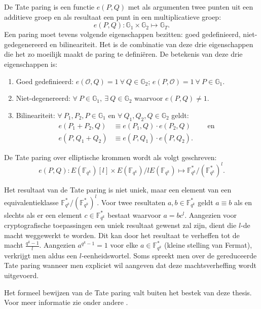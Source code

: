 De Tate paring is een functie $e(P, Q)$ met als argumenten twee punten uit een additieve groep en als resultaat een punt in een multiplicatieve groep:
\[e(P, Q): \mathbb{G}_1 \times \mathbb{G}_2 \mapsto \mathbb{G}_T.\]
Een paring moet tevens volgende eigenschappen bezitten: goed gedefinieerd, niet-gedegenereerd en bilineariteit. Het is de combinatie van deze drie eigenschappen die het zo moeilijk maakt de paring te defini\"eren. De betekenis van deze drie eigenschappen is:
\begin{enumerate}
	\item Goed gedefinieerd: $e(\mathcal{O}, Q) = 1 \: \forall \: Q \in \mathbb{G}_2$; $e(P, \mathcal{O}) = 1 \: \forall \: P \in \mathbb{G}_1$.
	
	\item Niet-degenereerd: $\forall \: P \in \mathbb{G}_1, \: \exists \: Q \in \mathbb{G}_2$ waarvoor $e(P, Q) \neq 1$.
	
	\item Bilineariteit: $\forall \: P_1, P_2, P \in \mathbb{G}_1$ en $\forall \: Q_1, Q_2, Q \in \mathbb{G}_2$ geldt:
		\[\begin{aligned}
			e(P_1 + P_2, Q) &\equiv e(P_1, Q) \cdot e(P_2, Q) \qquad \text{ en }\\
			e(P, Q_1 + Q_2) &\equiv e(P, Q_1) \cdot e(P, Q_2).
		\end{aligned}\]
\end{enumerate}

De Tate paring over elliptische krommen wordt als volgt geschreven:
\[e(P, Q): E(\mathbb{F}_{q^k})[l] \times E(\mathbb{F}_{q^k})/l E(\mathbb{F}_{q^k}) \mapsto \mathbb{F}_{q^k}^* / (\mathbb{F}_{q^k}^*)^l.\]

Het resultaat van de Tate paring is niet uniek, maar een element van een equivalentieklasse $\mathbb{F}_{q^k}^* / (\mathbb{F}_{q^k}^*)^l$. Voor twee resultaten $a, b \in \mathbb{F}_{q^k}^*$ geldt $a \equiv b$ als en slechts als er een element $c \in \mathbb{F}_{q^k}^*$ bestaat waarvoor $a = bc^l$. Aangezien voor cryptografische toepassingen een uniek resultaat gewenst zal zijn, dient die $l$-de macht weggewerkt te worden. Dit kan door het resultaat te verheffen tot de macht $\frac{q^k - 1 }{l}$. Aangezien $a^{q^k - 1} = 1$ voor elke $a \in \mathbb{F}_{q^k}^*$ (kleine stelling van Fermat), verkrijgt men aldus een $l$-eenheidswortel. Soms spreekt men over de gereduceerde Tate paring wanneer men expliciet wil aangeven dat deze machtsverheffing wordt uitgevoerd.

Het formeel bewijzen van de Tate paring valt buiten het bestek van deze thesis. Voor meer informatie zie onder andere \cite{maas, ruck, hess}.

